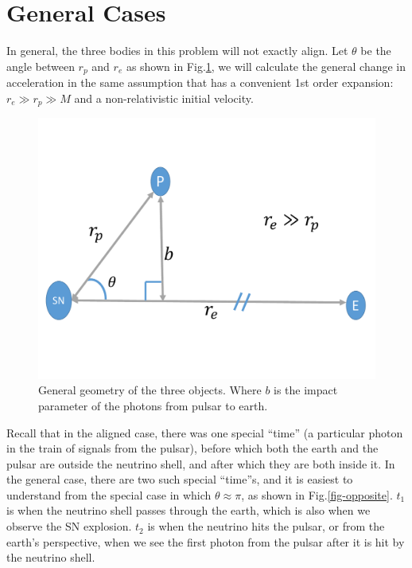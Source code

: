 \documentclass[aps,showpacs,twocolumn,floats,prd,superscriptaddress,nofootinbib]{revtex4-1}
\begin{document}
\section{General Cases}
\label{sec-3d}

In general, the three bodies in this problem will not exactly align. Let $\theta$ be the angle between $r_p$ and $r_e$ as shown in Fig.\ref{fig:3}, we will calculate the general change in acceleration in the same assumption that has a convenient 1st order expansion: $r_e\gg r_p\gg M$ and a non-relativistic initial velocity.

\begin{figure}[t]
\begin{center}
\includegraphics[scale = 0.3]{Image4.pdf}
\vspace{-8 mm}\caption{General geometry of the three objects. Where $b$ is the impact parameter of the photons from pulsar to earth. } 
\label{fig:3}
\end{center}
\end{figure}

Recall that in the aligned case, there was one special ``time'' (a particular photon in the train of signals from the pulsar), before which both the earth and the pulsar are outside the neutrino shell, and after which they are both inside it. In the general case, there are two such special ``time''s, and it is easiest to understand from the special case in which $\theta \approx \pi$, as shown in Fig.\ref{fig-opposite}. $t_1$ is when the neutrino shell passes through the earth, which is also when we observe the SN explosion.  $t_2$ is when the neutrino hits the pulsar, or from the earth's perspective, when we see the first photon from the pulsar after it is hit by the neutrino shell.
\end{document}
